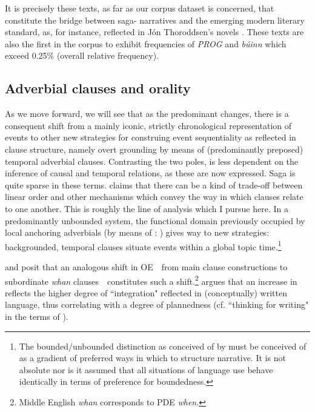 \documentclass[output=paper,colorlinks,citecolor=brown]{langscibook}
\begin{document}
It is precisely these texts, as far as our corpus dataset is concerned, that constitute the bridge between saga- narratives and the emerging modern literary standard, as, for instance, reflected in Jón Thoroddsen's novels \citep{bernhardhsson2018spreading}. These texts are also the first in the corpus to exhibit frequencies of \textit{PROG} and \textit{búinn} which exceed 0.25\% (overall relative frequency).

\subsection{Adverbial clauses and orality}\label{sec:Chark3.4}


As we move forward, we will see that as the predominant  changes, there is a consequent shift from a mainly iconic, strictly chronological representation of events to other new strategies for construing event sequentiality as reflected in clause structure, namely overt grounding by means of (predominantly preposed) temporal adverbial clauses. Contrasting the two poles,  is less dependent on the inference of causal and temporal relations, as these are now expressed. Saga  is quite sparse in these terms. \citet[39--71]{haiman1985natural} claims that there can be a kind of trade-off between linear order and other mechanisms which convey the way in which clauses relate to one another. This is roughly the line of analysis which I pursue here. In a predominantly unbounded system, the functional domain previously occupied by local anchoring adverbials (by means of : \cite{los2012}) gives way to new strategies: backgrounded, temporal clauses situate events within a global topic time.\footnote{The bounded/unbounded distinction as conceived of by \citet{carroll2003information} must be conceived of as a gradient of preferred ways in which to structure narrative. It is not absolute nor is it assumed that all situations of language use behave identically in terms of preference for boundedness.}

\citet{warvik1995a} and \citet{Brinton1996} posit that an analogous shift in  OE\ \textendash{}\  from main clause constructions to subordinate \textit{whan} clauses\ \textendash{}\  constitutes such a shift.\footnote{Middle English \textit{whan} corresponds to PDE \textit{when}.} \citet[179]{Brinton1996} argues that an increase in  reflects the higher degree of ``integration" reflected in (conceptually) written language, thus correlating with a degree of plannedness (cf. ``thinking for writing" in the terms of \cite{slobin2003language}).
\end{document}
